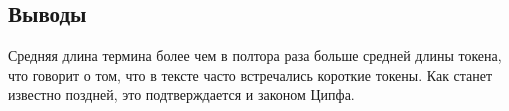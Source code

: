 \documentclass[a4paper, 12pt]{article}
\begin{document}
\vspace{1cm}


\subsection*{Выводы}
Средняя длина термина более чем в полтора раза больше средней длины токена, что говорит о том, что в тексте часто встречались короткие токены. Как станет известно поздней, это подтверждается и законом Ципфа.
\end{document}
